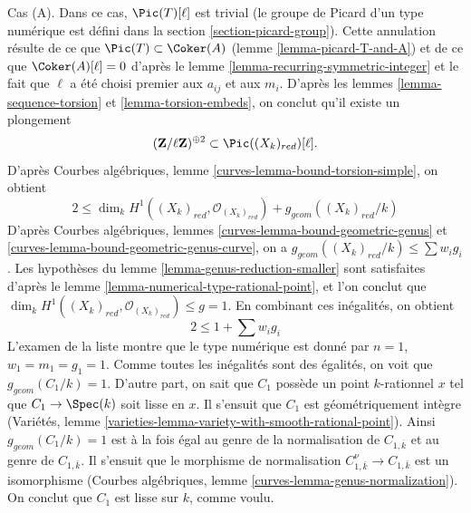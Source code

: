 \medskip\noindent
Cas (A). Dans ce cas, $\Pic(T)[\ell]$ est trivial (le groupe de Picard d'un
type numérique est défini dans la section \ref{section-picard-group}).
Cette annulation résulte de ce que $\Pic(T)\subset\Coker(A)$ (lemme
\ref{lemma-picard-T-and-A}) et de ce que $\Coker(A)[\ell]=0$ d'après le
lemme \ref{lemma-recurring-symmetric-integer} et le fait que $\ell$ a été
choisi premier aux $a_{ij}$ et aux $m_i$. D'après les lemmes
\ref{lemma-sequence-torsion} et \ref{lemma-torsion-embeds}, on conclut qu'il
existe un plongement
$$
(\mathbf{Z}/\ell \mathbf{Z})^{\oplus 2} \subset \Pic((X_k)_{red})[\ell].
$$
D'après Courbes algébriques, lemme
\ref{curves-lemma-bound-torsion-simple}, on obtient
$$
2 \leq \dim_k H^1((X_k)_{red}, \mathcal{O}_{(X_k)_{red}}) +
g_{geom}((X_k)_{red}/k)
$$
D'après Courbes algébriques, lemmes
\ref{curves-lemma-bound-geometric-genus} et
\ref{curves-lemma-bound-geometric-genus-curve}, on a
$g_{geom}((X_k)_{red}/k)\leq\sum w_ig_i$. Les hypothèses du lemme
\ref{lemma-genus-reduction-smaller} sont satisfaites d'après le lemme
\ref{lemma-numerical-type-rational-point}, et l'on conclut que
$\dim_kH^1((X_k)_{red},\mathcal{O}_{(X_k)_{red}})\leq g=1$.
En combinant ces inégalités, on obtient
$$
2 \leq 1 + \sum w_i g_i
$$
L'examen de la liste montre que le type numérique est donné par
$n=1$, $w_1=m_1=g_1=1$. Comme toutes les inégalités sont des égalités,
on voit que $g_{geom}(C_1/k)=1$. D'autre part, on sait que $C_1$ possède
un point $k$-rationnel $x$ tel que $C_1\to\Spec(k)$ soit lisse en $x$.
Il s'ensuit que $C_1$ est géométriquement intègre (Variétés, lemme
\ref{varieties-lemma-variety-with-smooth-rational-point}). Ainsi
$g_{geom}(C_1/k)=1$ est à la fois égal au genre de la normalisation de
$C_{1,\overline{k}}$ et au genre de $C_{1,\overline{k}}$. Il s'ensuit que
le morphisme de normalisation
$C_{1,\overline{k}}^\nu\to C_{1,\overline{k}}$ est un isomorphisme
(Courbes algébriques, lemme \ref{curves-lemma-genus-normalization}). On
conclut que $C_1$ est lisse sur $k$, comme voulu.

